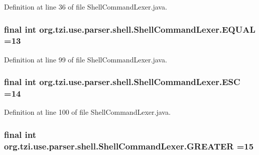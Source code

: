 Definition at line 36 of file Shell\-Command\-Lexer.\-java.

\hypertarget{classorg_1_1tzi_1_1use_1_1parser_1_1shell_1_1_shell_command_lexer_a297bc455fcda0e64aff27ebdf53d9a1a}{
\subsubsection[{E\-Q\-U\-A\-L}]{\setlength{\rightskip}{0pt plus 5cm}final int org.\-tzi.\-use.\-parser.\-shell.\-Shell\-Command\-Lexer.\-E\-Q\-U\-A\-L =13\hspace{0.3cm}{\ttfamily [static]}}}\label{classorg_1_1tzi_1_1use_1_1parser_1_1shell_1_1_shell_command_lexer_a297bc455fcda0e64aff27ebdf53d9a1a}


Definition at line 99 of file Shell\-Command\-Lexer.\-java.

\hypertarget{classorg_1_1tzi_1_1use_1_1parser_1_1shell_1_1_shell_command_lexer_ab4da69019ad709436b6b68a1482b4ce1}{
\subsubsection[{E\-S\-C}]{\setlength{\rightskip}{0pt plus 5cm}final int org.\-tzi.\-use.\-parser.\-shell.\-Shell\-Command\-Lexer.\-E\-S\-C =14\hspace{0.3cm}{\ttfamily [static]}}}\label{classorg_1_1tzi_1_1use_1_1parser_1_1shell_1_1_shell_command_lexer_ab4da69019ad709436b6b68a1482b4ce1}


Definition at line 100 of file Shell\-Command\-Lexer.\-java.

\hypertarget{classorg_1_1tzi_1_1use_1_1parser_1_1shell_1_1_shell_command_lexer_aaae6a8346a4d1de5d92ff7092bd9c7bb}{
\subsubsection[{G\-R\-E\-A\-T\-E\-R}]{\setlength{\rightskip}{0pt plus 5cm}final int org.\-tzi.\-use.\-parser.\-shell.\-Shell\-Command\-Lexer.\-G\-R\-E\-A\-T\-E\-R =15\hspace{0.3cm}{\ttfamily [static]}}}\label{classorg_1_1tzi_1_1use_1_1parser_1_1shell_1_1_shell_command_lexer_aaae6a8346a4d1de5d92ff7092bd9c7bb}


